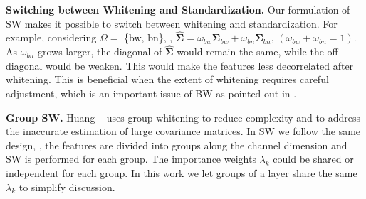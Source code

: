 \documentclass[10pt,twocolumn,letterpaper]{article}
\begin{document}
\noindent\textbf{Switching between Whitening and Standardization.}
Our formulation of SW makes it possible to switch between whitening and standardization.
For example, considering \(\Omega = \) \{bw, bn\}, \ie, \(\hat{\bm{\Sigma}} = \omega_{bw}\bm{\Sigma}_{bw} + \omega_{bn}\bm{\Sigma}_{bn}\), \((\omega_{bw}+\omega_{bn}=1)\).
As $\omega_{bn}$ grows larger, the diagonal of $\hat{\bm{\Sigma}}$ would remain the same, while the off-diagonal would be weaken.
This would make the features less decorrelated after whitening.
This is beneficial when the extent of whitening requires careful adjustment, which is an important issue of BW as pointed out in \cite{lei2018decorrelated}.


\noindent\textbf{Group SW.}
Huang \etal~\cite{lei2018decorrelated} uses group whitening to reduce complexity and to address the inaccurate estimation of large covariance matrices.
In SW we follow the same design, \ie, the features are divided into groups along the channel dimension and SW is performed for each group.
The importance weights $\lambda_k$ could be shared or independent for each group.
In this work we let groups of a layer share the same $\lambda_k$ to simplify discussion.


\setlength{\tabcolsep}{4pt}
\begin{table}[h]
	\begin{center}
		\caption{Comparisons of computational complexity. \(N, C, H, W\) are the number of samples, number of channels, height, and width of the input tensor respectively. $G$ denotes the number of channels for each group in group whitening.}
		\label{complexity}
	\end{center}
\vspace{-5pt}
\end{table}
\setlength{\tabcolsep}{1.4pt}
\end{document}
